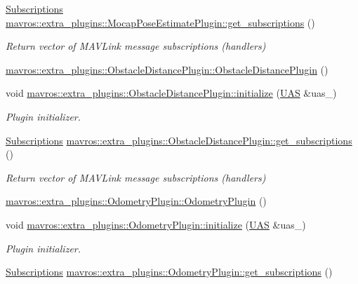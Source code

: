 \begin{DoxyCompactItemize}
\mbox{\hyperlink{group__plugin_ga8967d61fc77040e0c3ea5a4585d62a09}{Subscriptions}} \mbox{\hyperlink{group__plugin_gad79e8a39bc49a479f78b9222cc7cc68a}{mavros\+::extra\+\_\+plugins\+::\+Mocap\+Pose\+Estimate\+Plugin\+::get\+\_\+subscriptions}} ()
\begin{DoxyCompactList}\small\item\em Return vector of M\+A\+V\+Link message subscriptions (handlers) \end{DoxyCompactList}\item 
\mbox{\hyperlink{group__plugin_gaab73ed3ac03f5dbde2e6ddd4264ccfb2}{mavros\+::extra\+\_\+plugins\+::\+Obstacle\+Distance\+Plugin\+::\+Obstacle\+Distance\+Plugin}} ()
\item 
void \mbox{\hyperlink{group__plugin_gaf7844065d4ccf3cea88c251437553991}{mavros\+::extra\+\_\+plugins\+::\+Obstacle\+Distance\+Plugin\+::initialize}} (\mbox{\hyperlink{classmavros_1_1UAS}{U\+AS}} \&uas\+\_\+)
\begin{DoxyCompactList}\small\item\em Plugin initializer. \end{DoxyCompactList}\item 
\mbox{\hyperlink{group__plugin_ga8967d61fc77040e0c3ea5a4585d62a09}{Subscriptions}} \mbox{\hyperlink{group__plugin_ga03eef1ca035e4ab4ca9eb0841b6d9eef}{mavros\+::extra\+\_\+plugins\+::\+Obstacle\+Distance\+Plugin\+::get\+\_\+subscriptions}} ()
\begin{DoxyCompactList}\small\item\em Return vector of M\+A\+V\+Link message subscriptions (handlers) \end{DoxyCompactList}\item 
\mbox{\hyperlink{group__plugin_gaa5846c0b3650b8c78b7645ef11425752}{mavros\+::extra\+\_\+plugins\+::\+Odometry\+Plugin\+::\+Odometry\+Plugin}} ()
\item 
void \mbox{\hyperlink{group__plugin_gafc4d5bae52e8335f3fd027ef6c664c5a}{mavros\+::extra\+\_\+plugins\+::\+Odometry\+Plugin\+::initialize}} (\mbox{\hyperlink{classmavros_1_1UAS}{U\+AS}} \&uas\+\_\+)
\begin{DoxyCompactList}\small\item\em Plugin initializer. \end{DoxyCompactList}\item 
\mbox{\hyperlink{group__plugin_ga8967d61fc77040e0c3ea5a4585d62a09}{Subscriptions}} \mbox{\hyperlink{group__plugin_ga67f0c200b8288b38f454aadd9ea68710}{mavros\+::extra\+\_\+plugins\+::\+Odometry\+Plugin\+::get\+\_\+subscriptions}} ()

\end{DoxyCompactItemize}
